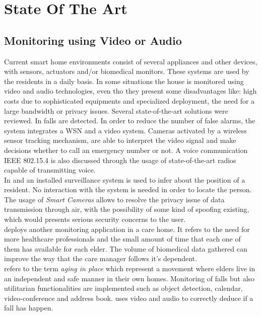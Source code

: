 \section{State Of The Art}

\subsection{Monitoring using Video or Audio}
Current smart home environments consist of several appliances and other devices, with sensors, actuators and/or biomedical monitors. These systems are used by the residents in a daily basis. In some situations the house is monitored using video and audio technologies, even tho they present some disadvantages like: high costs due to sophisticated equipments and specialized deployment, the need for a large bandwidth or privacy issues. 
Several state-of-the-art solutions were reviewed. In \cite{2} falls are detected. In order to reduce the number of false alarms, the system integrates a \acs{WSN} and a video system. Cameras activated by a wireless sensor tracking mechanism, are able to interpret the video signal and make decisions whether to call an emergency number or not. A voice communication \acs{IEEE} 802.15.4 is also discussed through the usage of state-of-the-art radios capable of transmitting voice.\\
In \cite{3} and \cite{4} an installed surveillance system is used to infer about the position of a resident. No interaction with the system is needed in order to locate the person. The usage of \textit{Smart Cameras} allows to resolve the privacy issue of data transmission through air, with the possibility of some kind of spoofing existing, which would presents serious security concerns to the user.\\
\cite{5} deploys another monitoring application in a care home. It refers to the need for more healthcare professionals and the small amount of time that each one of them has available for each elder. The volume of biomedical data gathered can improve the way that the care manager follows it's dependent.\\
\cite{6} refers to the term \textit{aging in place} which represent a movement where elders live in an independent and safe manner in their own homes. Monitoring of falls but also utilitarian functionalities are implemented such as object detection, calendar, video-conference and address book.\cite{7} uses video and audio to correctly deduce if a fall has happen.

